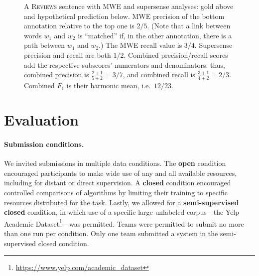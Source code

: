 \documentclass[11pt,letterpaper]{article}
\newcommand{\ensuretext}[1]{#1}
\newcommand{\nssmarker}{\ensuretext{\textcolor{magenta}{\ensuremath{^{\textsc{NS}}_{\textsc{S}}}}}}
\newcommand{\arkcomment}[3]{\ensuretext{\textcolor{#3}{[#1 #2]}}}
\newcommand{\nss}[1]{\arkcomment{\nssmarker}{#1}{magenta}}
\begin{document}
\begin{figure}[t]
\begin{tikzpicture}[baseline={($(current bounding box.center)+(0,-0.5ex)$)}, node distance=0cm, auto,]
\end{tikzpicture}
\caption{A \textsc{Reviews} sentence with MWE and supersense analyses: gold above and hypothetical prediction below. 
MWE precision of the bottom annotation relative to the top one is $2/5$. %
(Note that a link between words $w_1$ and $w_2$ is ``matched'' 
if, in the other annotation, there is a path between $w_1$ and $w_2$.) 
The MWE recall value is $3/4$. 
Supersense precision and recall are both $1/2$.
Combined precision/recall scores add the respective subscores' numerators and denominators:
thus, combined precision is $\tfrac{2+1}{5+2} = 3/7$, 
and combined recall is $\tfrac{3+1}{4+2} = 2/3$.
Combined $F_1$ is their harmonic mean, i.e.~$12/23$.
}
\label{fig:linkmeasure}
\end{figure}


\section{Evaluation}\label{sec:eval}

\paragraph{Submission conditions.}
We invited submissions in multiple data conditions. %
The \textbf{open} condition encouraged participants to make 
wide use of any and all available resources, including for 
distant or direct supervision. 
A \textbf{closed} condition encouraged controlled comparisons of algorithms 
by limiting their training to specific resources distributed for the task. 
Lastly, we allowed for a \textbf{semi-supervised closed} condition, in which 
use of a specific large unlabeled corpus---the Yelp Academic Dataset\footnote{\url{https://www.yelp.com/academic_dataset}}---was permitted.
Teams were permitted to submit no more than one run per condition.
Only one team submitted a system in the semi-supervised closed condition.
\end{document}
